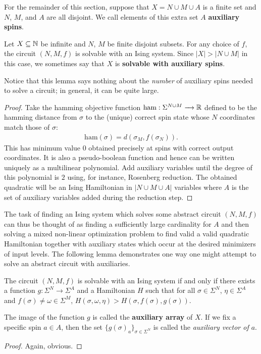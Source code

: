 \documentclass{article}
\begin{document}
For the remainder of this section, suppose that $X = N \cup M \cup A$ is a finite set and $N$, $M$, and $A$ are all disjoint. We call elements of this extra set $A$ \textbf{auxiliary spins}.

\begin{prop}\label{prop:all-circuits-solvable-with-auxiliaries}
  Let $X \subseteq \mathbb{N}$ be infinite and $N$, $M$ be finite disjoint subsets. For any choice of $f$, the circuit $(N, M, f)$ is solvable with an Ising system. Since $|X| > |N\cup M|$ in this case, we sometimes say that $X$ is \textbf{solvable with auxiliary spins}.
\end{prop}
Notice that this lemma says nothing about the \emph{number} of auxiliary spins needed to solve a circuit; in general, it can be quite large.
\begin{proof}
  Take the hamming objective function $\text{ham}:\Sigma^{N\cup M} \to \bR$ defined to be the hamming distance from $\sigma$ to the (unique) correct spin state whose $N$ coordinates match those of $\sigma$:
  \begin{align*}
    \text{ham}(\sigma) = d(\sigma_M, f(\sigma_N)).
  \end{align*}
This has minimum value $0$ obtained precisely at spins with correct output coordinates. It is also a pseudo-boolean function and hence can be written uniquely as a multilinear polynomial. Add auxiliary variables until the degree of this polynomial is $2$ using, for instance, Rosenberg reduction. The obtained quadratic will be an Ising Hamiltonian in $|N \cup M \cup A|$ variables where $A$ is the set of auxiliary variables added during the reduction step. 
\end{proof}

The task of finding an Ising system which solves some abstract circuit $(N, M, f)$ can thus be thought of as finding a sufficiently large cardinality for $A$ and then solving a mixed non-linear optimization problem to find valid a valid quadratic Hamiltonian together with auxiliary states which occur at the desired minimizers of input levels. The following lemma demonstrates one way one might attempt to solve an abstract circuit with auxiliaries. 

\begin{lem}\label{lem:weak-constraints}
  The circuit $(N,M,f)$ is solvable with an Ising system if and only if there exists a function $g:\Sigma^N \to \Sigma^A$ and a Hamiltonian $H$ such that for all $\sigma \in \Sigma^N$, $\eta \in \Sigma^A$ and $f(\sigma) \neq \omega \in \Sigma^M$, $H(\sigma, \omega, \eta) > H(\sigma, f(\sigma), g(\sigma))$.
\end{lem}
The image of the function $g$ is called the \textbf{auxiliary array} of $X$. If we fix a specific spin $a \in A$, then the set $\{g(\sigma)_a\}_{\sigma \in \Sigma^N}$ is called the \emph{auxiliary vector of $a$}.
\begin{proof}
  Again, obvious.
\end{proof}
\end{document}
